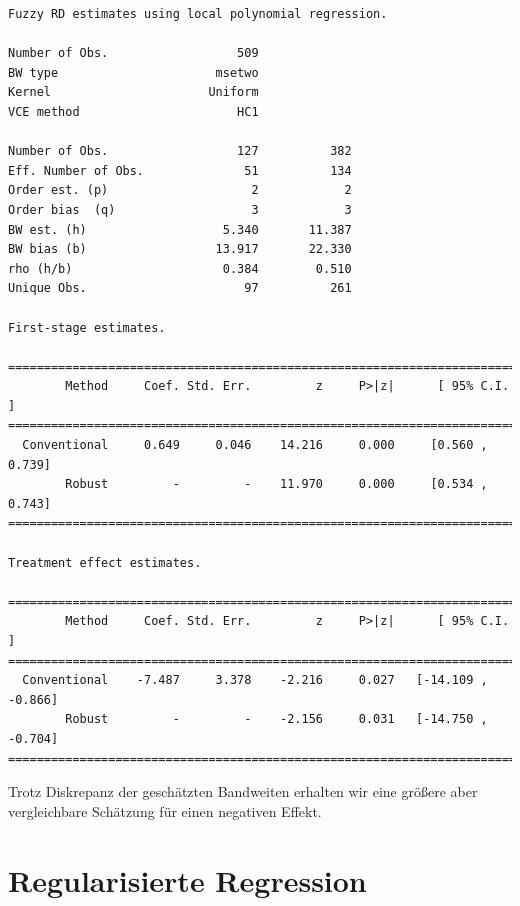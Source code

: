 \documentclass[
  a4paper,
  DIV=11,
  oneside]{scrreprt}
\begin{document}
\begin{verbatim}
Fuzzy RD estimates using local polynomial regression.

Number of Obs.                  509
BW type                      msetwo
Kernel                      Uniform
VCE method                      HC1

Number of Obs.                  127          382
Eff. Number of Obs.              51          134
Order est. (p)                    2            2
Order bias  (q)                   3            3
BW est. (h)                   5.340       11.387
BW bias (b)                  13.917       22.330
rho (h/b)                     0.384        0.510
Unique Obs.                      97          261

First-stage estimates.

=============================================================================
        Method     Coef. Std. Err.         z     P>|z|      [ 95% C.I. ]       
=============================================================================
  Conventional     0.649     0.046    14.216     0.000     [0.560 , 0.739]     
        Robust         -         -    11.970     0.000     [0.534 , 0.743]     
=============================================================================

Treatment effect estimates.

=============================================================================
        Method     Coef. Std. Err.         z     P>|z|      [ 95% C.I. ]       
=============================================================================
  Conventional    -7.487     3.378    -2.216     0.027   [-14.109 , -0.866]    
        Robust         -         -    -2.156     0.031   [-14.750 , -0.704]    
=============================================================================
\end{verbatim}

Trotz Diskrepanz der geschätzten Bandweiten erhalten wir eine größere
aber vergleichbare Schätzung für einen negativen Effekt.


\hypertarget{regularisierte-regression}{%
\chapter{Regularisierte Regression}\label{regularisierte-regression}}
\end{document}
